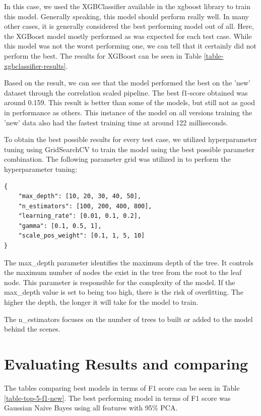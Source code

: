 In this case, we used the XGBClassifier available in the xgboost library to train this model. Generally speaking, this model should perform really well. In many other cases, it is generally considered the best performing model out of all. Here, the XGBoost model mostly performed as was expected for each test case. While this model was not the worst performing one, we can tell that it certainly did not perform the best. The results for XGBoost can be seen in Table \ref{table-xgbclassifier-results}.



Based on the result, we can see that the model performed the best on the 'new' dataset through the correlation scaled pipeline. The best f1-score obtained was around 0.159. This result is better than some of the models, but still not as good in performance as others. This instance of the model on all versions training the 'new' data also had the fastest training time at around 122 milliseconds.

To obtain the best possible results for every test case, we utilized hyperparameter tuning using GridSearchCV to train the model using the best possible parameter combination. 
The following parameter grid was utilized in to perform the hyperparameter tuning:

\begin{lstlisting}
{
    "max_depth": [10, 20, 30, 40, 50],
    "n_estimators": [100, 200, 400, 800],
    "learning_rate": [0.01, 0.1, 0.2],
    "gamma": [0.1, 0.5, 1],
    "scale_pos_weight": [0.1, 1, 5, 10]
}
\end{lstlisting}

The max\_depth parameter identifies the maximum depth of the tree. It controls the maximum number of nodes the exist in the tree from the root to the leaf node. This parameter is responsible for the complexity of the model. If the max\_depth value is set to being too high, there is the risk of overfitting. The higher the depth, the longer it will take for the model to train.

The n\_estimators focuses on the number of trees to built or added to the model behind the scenes. 

\section{Evaluating Results and comparing}
The tables comparing best models in terms of F1 score can be seen in Table \ref{table-top-5-f1-new}. The best performing model in terms of F1 score was Gaussian Naive Bayes using all features with 95\% PCA.

